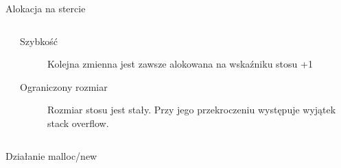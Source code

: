 \documentclass{beamer}
\begin{document}
    

\begin{frame}{Alokacja na stercie}
    
    \begin{columns}
        \begin{column}{0.3\textwidth} 
            \inputminted{cpp}{stack_alloc.cpp}
        \end{column}
        \begin{column}{0.65\textwidth} 
            \begin{description}
                \item[Szybkość] Kolejna zmienna jest zawsze alokowana na wskaźniku stosu +1
                \item[Ograniczony rozmiar] Rozmiar stosu jest stały. 
                    Przy jego przekroczeniu występuje wyjątek stack overflow.
            \end{description}
        \end{column}
    \end{columns}
\end{frame} 

\begin{frame}{Działanie malloc/new}


\end{frame}
    
\end{document}
